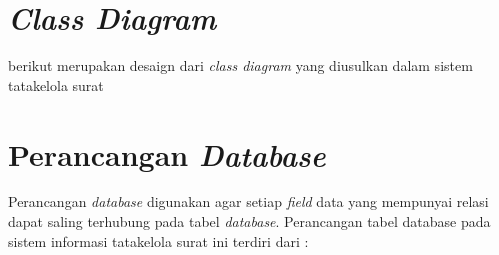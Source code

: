 \section{\textit{Class Diagram}}

berikut merupakan desaign dari \textit{class diagram} yang diusulkan dalam sistem tatakelola surat

\section{Perancangan \textit{Database}}

Perancangan \textit{database} digunakan agar  setiap \textit{field} data  yang  mempunyai relasi dapat saling terhubung pada tabel \textit{database}. Perancangan tabel database pada sistem informasi tatakelola surat ini terdiri dari :

